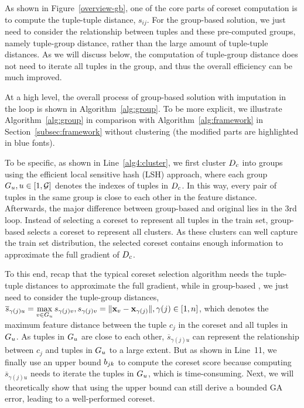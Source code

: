 As shown in Figure~\ref{overview-gb}, one of the core parts of coreset computation is to compute the tuple-tuple distance, \ie $s_{ij}$. For the group-based solution, we just need to consider the relationship between tuples and these pre-computed groups, namely tuple-group distance, rather than the large amount of tuple-tuple distances. As we will discuss below, the computation of tuple-group distance does not need to iterate all tuples in the group, and thus  the overall efficiency can be much improved. 

At a high level, the overall process of group-based \ours solution with imputation in the loop is shown in Algorithm~\ref{alg:group}. To be more explicit, we illustrate Algorithm~\ref{alg:group} in comparison with Algorithm~\ref{alg:framework} in Section~\ref{subsec:framework} without clustering (the modified parts are highlighted in blue fonts).

To be specific, as shown in Line~\ref{alg4:cluster}, we first cluster $D_c$ into groups using the efficient local sensitive hash (LSH) approach, where each group $G_u, u\in[1, \mathcal{G}]$ denotes the indexes of tuples in $D_c$. In this way, every pair of tuples in the same group is close to each other in the feature distance.
%
 Afterwards, the major difference between group-based \ours and original \ours lies in the 3rd loop. Instead of  selecting a coreset to represent all tuples in the train set, group-based \ours selects a coreset to represent all clusters. As these clusters can well capture the train set distribution, the selected coreset contains enough information to approximate the full gradient of $D_c$. 
 
 To this end, recap that the typical coreset selection algorithm needs the tuple-tuple distances to approximate the full gradient, while in group-based \ours, we just need to consider the tuple-group distances, \ie  
$\overline{s}_{\gamma(j)u} = \max\limits_{v \in G_u} s_{\gamma(j)v}, s_{\gamma(j)v} = \lVert\mathbf{x}_v - \mathbf{x}_{\gamma(j)}\rVert, \gamma(j)\in[1, n]$, which denotes the maximum feature distance between the tuple $c_j$ in the coreset and all tuples in $G_u$. As tuples in $G_u$ are close to each other, $\overline{s}_{\gamma(j)u}$ can represent the relationship between $c_j$ and tuples in $G_u$ to a large extent. But as shown in Line~11, we finally use an upper bound $b_{jk}$ to compute the coreset score because computing $\overline{s}_{\gamma(j)u}$ needs to iterate the tuples in $G_u$, which is time-consuming. Next, we will theoretically show that using the upper bound can still derive a bounded GA error, leading to a well-performed coreset. 

